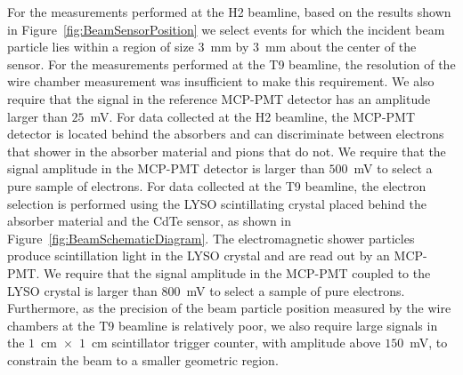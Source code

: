 For the measurements performed at the H2 beamline, 
based on the results shown in Figure~\ref{fig:BeamSensorPosition} we select events
for which the incident beam particle lies within a region of size $3$~mm by $3$~mm 
about the center of the sensor. For the measurements performed at the T9 beamline,
the resolution of the wire chamber measurement was insufficient to make this 
requirement. We also require that the 
signal in the reference MCP-PMT detector has an amplitude larger than $25$~mV. 
For data collected at the H2 beamline, the MCP-PMT detector is located behind
the absorbers and can discriminate between electrons that shower in the absorber
material and pions that do not. We require that the signal amplitude in the 
MCP-PMT detector is larger than $500$~mV to select a pure sample of electrons. For
data collected at the T9 beamline, the electron selection is performed using
the LYSO scintillating crystal placed behind the absorber material and the CdTe sensor,
as shown in Figure~\ref{fig:BeamSchematicDiagram}. The electromagnetic shower particles produce
scintillation light in the LYSO crystal and are read out by an MCP-PMT. We require that
the signal amplitude in the MCP-PMT coupled to the LYSO crystal is larger than $800$~mV
to select a sample of pure electrons. Furthermore, as the precision of the beam particle position 
measured by the wire chambers at the T9 beamline is relatively poor, we also require
large signals in the $1$~cm~$\times$~$1$~cm scintillator trigger counter, with
amplitude above $150$~mV, to constrain the beam to a smaller geometric region. 
